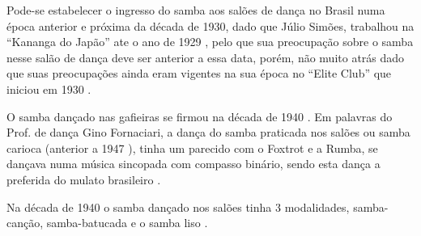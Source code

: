 Pode-se estabelecer o ingresso do samba aos salões de dança no Brasil numa época anterior e próxima da década de 1930,
dado que Júlio Simões, trabalhou na ``Kananga do Japão'' ate o ano de 1929 \cite[pp. 3 - cad. 3]{juliosimoes}  
\cite[pp. 11]{eliteinaugura} \cite[pp. 1 - cad. B]{gafieira2000reis}, pelo que sua preocupação sobre o samba 
nesse salão de dança deve ser anterior a essa data, porém, não muito atrás dado que 
suas preocupações ainda eram vigentes na sua época no ``Elite Club'' 
que iniciou em 1930 \cite[pp. 11]{eliteinaugura} \cite[pp. 3 - cad. 3]{juliosimoes} \cite[pp. 10]{simoesjournalbrasil1}.


O samba dançado nas gafieiras se firmou na década de 1940 \cite[pp. 142]{perna2002samba}. 
Em palavras do Prof. de dança Gino Fornaciari, 
a dança do samba praticada nos salões ou samba carioca (anterior a 1947 \cite[pp. 50]{fornaciari1947aprender}), 
 tinha um parecido com o Foxtrot e a Rumba, se dançava numa música sincopada com compasso binário,
sendo esta dança a preferida do mulato brasileiro
\cite[pp. 50-51]{fornaciari1947aprender}.


Na década de 1940 o samba dançado nos salões 
tinha 3 modalidades, samba-canção, samba-batucada e o samba liso \cite[pp. 58]{freitas1959danca} \cite[pp. 142-143]{perna2002samba} 
\cite[pp. 51]{fornaciari1947aprender}\cite[pp. 51]{fornaciari1950aprender}.

